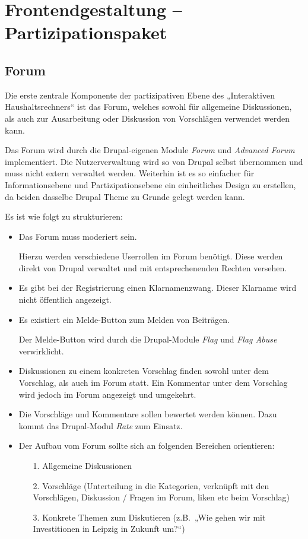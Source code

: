 \documentclass[a4paper,11pt,twoside]{article}
\begin{document}
\section{Frontendgestaltung -- Partizipationspaket}

\subsection{Forum}
Die erste zentrale Komponente der partizipativen Ebene des „Interaktiven
Haushaltsrechners“ ist das Forum, welches sowohl für allgemeine Diskussionen,
als auch zur Ausarbeitung oder Diskussion von Vorschlägen verwendet werden
kann. 

Das Forum wird durch die Drupal-eigenen Module \textit{Forum} und
\textit{Advanced Forum} implementiert. Die Nutzerverwaltung wird so von Drupal
selbst übernommen und muss nicht extern verwaltet werden. Weiterhin ist es so
einfacher für Informationsebene und Partizipationsebene ein einheitliches
Design zu erstellen, da beiden dasselbe Drupal Theme zu Grunde gelegt werden
kann.

Es ist wie folgt zu strukturieren:
\begin{itemize}
\item Das Forum muss moderiert sein.

  Hierzu werden verschiedene Userrollen im Forum benötigt. Diese werden direkt
  von Drupal verwaltet und mit entsprechenenden Rechten versehen.

\item Es gibt bei der Registrierung einen Klarnamenzwang. Dieser Klarname wird
  nicht öffentlich angezeigt.
\item Es existiert ein Melde-Button zum Melden von Beiträgen. 

  Der Melde-Button wird durch die Drupal-Module \textit{Flag} und \textit{Flag
    Abuse} verwirklicht.

\item Diskussionen zu einem konkreten Vorschlag finden sowohl unter dem
  Vorschlag, als auch im Forum statt. Ein Kommentar unter dem Vorschlag wird
  jedoch im Forum angezeigt und umgekehrt.
\item Die Vorschläge und Kommentare sollen bewertet werden können. Dazu kommt
  das Drupal-Modul \textit{Rate} zum Einsatz.
\item Der Aufbau vom Forum sollte sich an folgenden Bereichen orientieren:
  \begin{itemize}
  \item[1.] Allgemeine Diskussionen
  \item[2.] Vorschläge (Unterteilung in die Kategorien, verknüpft mit den
    Vorschlägen, Diskussion / Fragen im Forum, liken etc beim Vorschlag)
  \item[3.] Konkrete Themen zum Diskutieren (z.B.\ „Wie gehen wir mit
    Investitionen in Leipzig in Zukunft um?“)
  \end{itemize}
\end{itemize}
\end{document}
